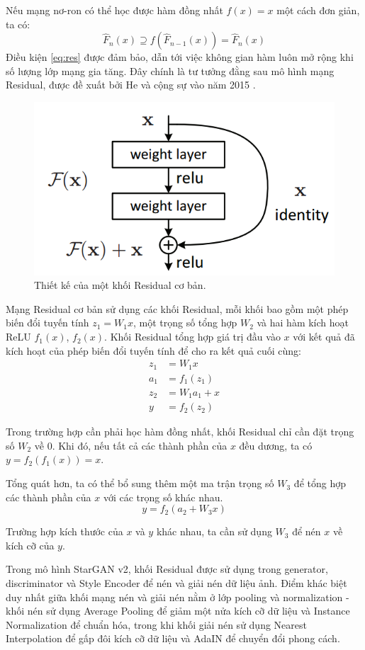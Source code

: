 \documentclass[12pt]{extreport}
\begin{document}
Nếu mạng nơ-ron có thể học được hàm đồng nhất $ f(x) = x $ một cách đơn giản, ta có:
$$ \hat{F}_{n}(x) \supseteq f(\hat{F}_{n-1}(x)) = \hat{F}_n(x) $$
Điều kiện \ref{eq:res} được đảm bảo, dẫn tới việc không gian hàm luôn mở rộng khi số lượng lớp mạng gia tăng. Đây chính là tư tưởng đằng sau mô hình mạng Residual, được đề xuất bởi He và cộng sự vào năm 2015 \cite{he2015deep}.

\begin{figure}[H]
    \centering
    \includegraphics[width=0.7\linewidth]{figure33.png}
    \caption{Thiết kế của một khối Residual cơ bản.}
\end{figure}

Mạng Residual cơ bản sử dụng các khối Residual, mỗi khối bao gồm một phép biến đổi tuyến tính $ z_1 = W_1x $, một trọng số tổng hợp $ W_2 $ và hai hàm kích hoạt ReLU $ f_1(x) $, $ f_2(x) $. Khối Residual tổng hợp giá trị đầu vào $ x $ với kết quả đã kích hoạt của phép biến đổi tuyến tính để cho ra kết quả cuối cùng:
\begin{align*}
    z_1 & = W_1x       \\
    a_1 & = f_1(z_1)   \\
    z_2 & = W_1a_1 + x \\
    y   & = f_2(z_2)
\end{align*}

Trong trường hợp cần phải học hàm đồng nhất, khối Residual chỉ cần đặt trọng số $ W_2 $ về 0. Khi đó, nếu tất cả các thành phần của $ x $ đều dương, ta có $ y = f_2(f_1(x)) = x $.

Tổng quát hơn, ta có thể bổ sung thêm một ma trận trọng số $ W_3 $ để tổng hợp các thành phần của $ x $ với các trọng số khác nhau.
$$ y = f_2(a_2 + W_3x) $$

Trường hợp kích thước của $ x $ và $ y $ khác nhau, ta cần sử dụng $ W_3 $ để nén $ x $ về kích cỡ của $ y $.

Trong mô hình StarGAN v2, khối Residual được sử dụng trong generator, discriminator và Style Encoder để nén và giải nén dữ liệu ảnh. Điểm khác biệt duy nhất giữa khối mạng nén và giải nén nằm ở lớp pooling và normalization - khối nén sử dụng Average Pooling để giảm một nửa kích cỡ dữ liệu và Instance Normalization để chuẩn hóa, trong khi khối giải nén sử dụng Nearest Interpolation để gấp đôi kích cỡ dữ liệu và AdaIN để chuyển đổi phong cách.
\end{document}
